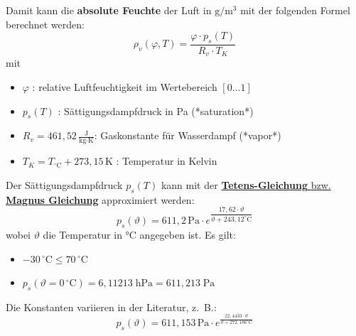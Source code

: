 Damit kann die \textbf{absolute Feuchte} der Luft in $\text{g} / \text{m}^3$ mit der folgenden Formel berechnet werden:
\begin{equation}
    \rho_v(\varphi, T) = \frac{\varphi \cdot p_s(T)}{R_v \cdot T_K}
\end{equation}
mit 
\begin{itemize}
    \item $\varphi$ : relative Luftfeuchtigkeit im Wertebereich $[0 \dots  1]$
    \item $p_s(T)$ :  Sättigungsdampfdruck in Pa (*saturation*)
    \item $R_v = 461,52\, \frac{\text{J}}{\text{kg} \cdot \text{K}}$: Gaskonstante für Wasserdampf (*vapor*)
    \item $T_K = T_{{}^\circ\text{C}} + 273,15\, \text{K}$ : Temperatur in Kelvin
\end{itemize}

Der Sättigungsdampfdruck $p_s(T)$ kann mit der \href{https://www.chemie.de/lexikon/S%C3%A4ttigungsdampfdruck.html} {\textbf{Tetens-Gleichung} bzw. \textbf{Magnus Gleichung}} approximiert werden:
\begin{equation}
    p_s(\vartheta) = 611{,}2\, \text{Pa} \cdot e^{\dfrac{17{,}62 \cdot \vartheta}{\vartheta + 243{,}12^\circ\text{C}}}
\end{equation}
wobei $\vartheta$ die Temperatur in °C angegeben ist.
Es gilt: 
\begin{itemize}
    \item $-30\,{}^\circ\mathrm{C} \leq 70\,{}^\circ\mathrm{C}$
    \item $p_s(\vartheta = 0\,{}^\circ\mathrm{C}) = 6{,}11213\;\mathrm{hPa} = 611{,}213\;\mathrm{Pa}$
\end{itemize}

Die Konstanten variieren in der Literatur, z.\ B.:
\begin{equation}
    p_s(\vartheta) 
    = 
    611{,}153\, \text{Pa} \cdot e^{\frac{22{,}4433 \cdot \vartheta}{\vartheta + 272{,}186^\circ\text{C}}}
\end{equation}

